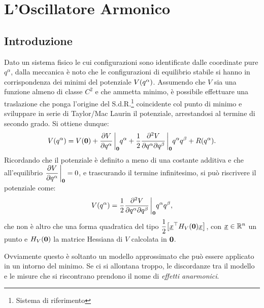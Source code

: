 \chapter{L'Oscillatore Armonico}
    \section{Introduzione}
    Dato un sistema fisico le cui configurazioni sono identificate dalle coordinate pure $q^\alpha$, dalla meccanica \`e noto che le configurazioni di equilibrio stabile si hanno in corrispondenza dei minimi del potenziale $V\qty(q^\alpha)$. Assumendo che $V$ sia una funzione almeno di classe $C^2$ e che ammetta minimo, \`e possibile effettuare una traslazione che ponga l'origine del S.d.R.\footnote{Sistema di riferimento} coincidente col punto di minimo e sviluppare in serie di Taylor/Mac Laurin il potenziale, arrestandosi al termine di secondo grado. Si ottiene dunque: $$V\qty(q^\alpha)=V\qty(\vb{0})+\pdv{V}{q^\alpha}\eval_{\vb{0}}q^\alpha+\frac{1}{2}\pdv{V}{q^\alpha}{q^\beta}\eval_{\vb{0}}q^\alpha q^\beta+R\qty(q^\alpha).$$ Ricordando che il potenziale \`e definito a meno di una costante additiva e che all'equilibrio $\displaystyle\pdv{V}{q^\alpha}\eval_{\vb{0}}=0$, e trascurando il termine infinitesimo, si pu\`o riscrivere il potenziale come:
    \begin{equation}
        V\qty(q^\alpha)=\frac{1}{2}\pdv{V}{q^\alpha}{q^\beta}\eval_{\vb{0}}q^\alpha q^\beta,
        \label{eq:potenziale:1}
    \end{equation} che non \`e altro che una forma quadratica del tipo $\displaystyle\frac{1}{2}\qty[\underline{x}^\top H_V\qty(\vb{0})\underline{x}]$, con $\underline{x}\in\mathbb{R}^n$ un punto e $H_V\qty(\vb{0})$ la matrice Hessiana di $V$ calcolata in $\vb{0}$. \par Ovviamente questo \`e soltanto un modello approssimato che pu\`o essere applicato in un intorno del minimo. Se ci si allontana troppo, le discordanze tra il modello e le misure che si riscontrano prendono il nome di \emph{effetti anarmonici}.
